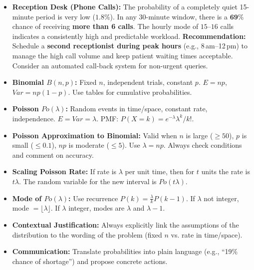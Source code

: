 \documentclass[11pt]{article}
\begin{document}
\begin{exoresolu}
\begin{itemize}
\item \textbf{Reception Desk (Phone Calls):} The probability of a completely quiet 15-minute period is very low ($1.8\%$). In any 30-minute window, there is a $\mathbf{69\%}$ chance of receiving \textbf{more than 6 calls}. The hourly mode of $15$--$16$ calls indicates a consistently high and predictable workload.
      \textbf{Recommendation:} Schedule a \textbf{second receptionist during peak hours} (e.g., 8\,am--12\,pm) to manage the high call volume and keep patient waiting times acceptable. Consider an automated call-back system for non-urgent queries.
\end{itemize}
\end{exoresolu}

\begin{aretenir}
\begin{itemize}
\item \textbf{Binomial $B(n,p)$:} Fixed $n$, independent trials, constant $p$. $E=np$, $Var=np(1-p)$. Use tables for cumulative probabilities.
\item \textbf{Poisson $Po(\lambda)$:} Random events in time/space, constant rate, independence. $E=Var=\lambda$. PMF: $P(X=k)=e^{-\lambda}\lambda^k/k!$.
\item \textbf{Poisson Approximation to Binomial:} Valid when $n$ is large ($\ge 50$), $p$ is small ($\le 0.1$), $np$ is moderate ($\le 5$). Use $\lambda = np$. Always check conditions and comment on accuracy.
\item \textbf{Scaling Poisson Rate:} If rate is $\lambda$ per unit time, then for $t$ units the rate is $t\lambda$. The random variable for the new interval is $Po(t\lambda)$.
\item \textbf{Mode of $Po(\lambda)$:} Use recurrence $P(k)=\frac{\lambda}{k}P(k-1)$. If $\lambda$ not integer, mode $= \lfloor \lambda \rfloor$. If $\lambda$ integer, modes are $\lambda$ and $\lambda-1$.
\item \textbf{Contextual Justification:} Always explicitly link the assumptions of the distribution to the wording of the problem (fixed $n$ vs. rate in time/space).
\item \textbf{Communication:} Translate probabilities into plain language (e.g., ``19\% chance of shortage'') and propose concrete actions.
\end{itemize}
\end{aretenir}
\end{document}
